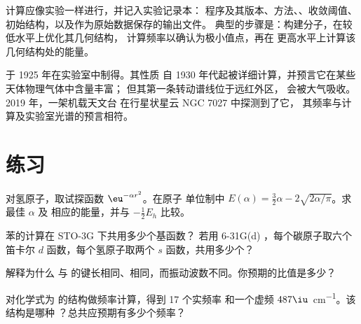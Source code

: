 \begin{inthelab}[计算实验]
计算应像实验一样进行，并记入实验记录本：
程序及其版本、方法、、收敛阈值、
初始结构，以及作为原始数据保存的输出文件。
典型的步骤是：构建分子，在较低水平上优化其几何结构，
计算频率以确认为极小值点，再在
更高水平上计算该几何结构处的能量。
\end{inthelab}

\begin{history}[一种先由计算得知的分子]
 于 1925 年在实验室中制得。其性质
自 1930 年代起被详细计算，并预言它在某些天体物理气体中含量丰富；
但其第一条转动谱线位于远红外区，
会被大气吸收。2019 年，一架机载天文台
在行星状星云 NGC 7027 中探测到了它，
其频率与计算及实验室光谱的预言相符。
\end{history}

\section{练习}

\begin{exercise}[$\star$]\label{exo:b3:computational-chemistry:1}
对氢原子，取试探函数 $\eu^{-\alpha r^2}$。在原子
单位制中 $E(\alpha) = \frac32\alpha - 2\sqrt{2\alpha/\pi}$。求最佳 $\alpha$ 及
相应的能量，并与 $-\frac12E_h$ 比较。
\end{exercise}

\begin{exercise}[$\star$]\label{exo:b3:computational-chemistry:2}
苯的计算在 STO-3G 下共用多少个基函数？
若用 6-31G(d) ，每个碳原子取六个笛卡尔 $d$ 函数，每个氢原子取两个 $s$
函数，共用多少个？
\end{exercise}

\begin{exercise}[$\star$]\label{exo:b3:computational-chemistry:3}
解释为什么  与  的键长相同、相同，而振动波数不同。你预期的比值是多少？
\end{exercise}

\begin{exercise}[$\star$]\label{exo:b3:computational-chemistry:4}
对化学式为  的结构做频率计算，得到 17 个实频率
和一个虚频 $487\iu$~\unit{cm^{-1}}。该结构是哪种
？总共应预期有多少个频率？
\end{exercise}

